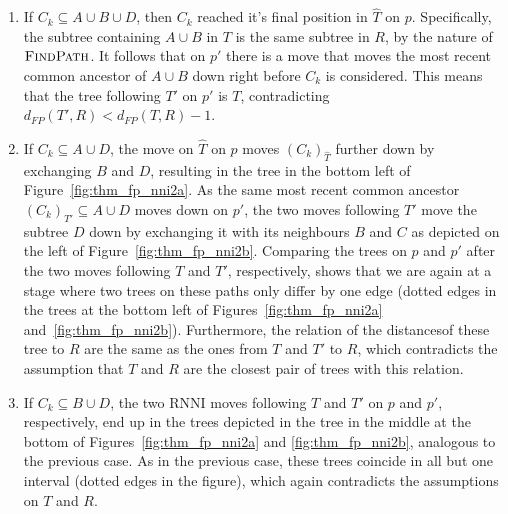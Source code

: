 \documentclass{amsart}
\newcommand{\rnni}{\mathrm{RNNI}}
\newcommand{\findpath}{\textsc{FindPath}}
\begin{document}
\begin{enumerate}
    \begin{enumerate}
        \item
            If $C_k \subseteq A \cup B \cup D$, then $C_k$ reached it's final position in $\hat T$ on $p$.
            Specifically, the subtree containing $A \cup B$ in $T$ is the same subtree in $R$, by the nature of $\findpath$.
            It follows that on $p'$ there is a move that moves the most recent common ancestor of $A \cup B$ down right before $C_k$ is considered.
            This means that the tree following $T'$ on $p'$ is $T$, contradicting $d_{FP}(T',R) < d_{FP}(T,R) - 1$.
        \item
            If $C_k \subseteq A \cup D$, the move on $\hat T$ on $p$ moves $(C_k)_{\hat T}$ further down by exchanging $B$ and $D$, resulting in the tree in the bottom left of Figure~\ref{fig:thm_fp_nni2a}.
            As the same most recent common ancestor $(C_k)_{T'} \subseteq A \cup D$ moves down on $p'$, the two moves following $T'$ move the subtree $D$ down by exchanging it with its neighbours $B$ and $C$ as depicted on the left of Figure~\ref{fig:thm_fp_nni2b}.
            Comparing the trees on $p$ and $p'$ after the two moves following $T$ and $T'$, respectively, shows that we are again at a stage where two trees on these paths only differ by one edge (dotted edges in the trees at the bottom left of Figures~\ref{fig:thm_fp_nni2a} and~\ref{fig:thm_fp_nni2b}).
            Furthermore, the relation of the distancesof these tree to $R$ are the same as the ones from $T$ and $T'$ to $R$, which contradicts the assumption that $T$ and $R$ are the closest pair of trees with this relation.
        \item
            If $C_k \subseteq B \cup D$, the two $\rnni$ moves following $T$ and $T'$ on $p$ and $p'$, respectively, end up in the trees depicted in the tree in the middle at the bottom of Figures~\ref{fig:thm_fp_nni2a} and \ref{fig:thm_fp_nni2b}, analogous to the previous case.
            As in the previous case, these trees coincide in all but one interval (dotted edges in the figure), which again contradicts the assumptions on $T$ and $R$.
    \end{enumerate}


\end{enumerate}
\end{document}
